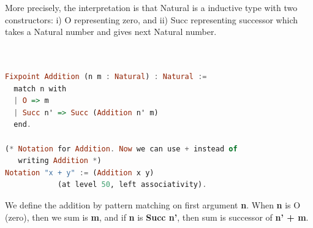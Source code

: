 More precisely, the interpretation is that Natural is a inductive type with two constructors: i) O representing zero,
and ii) Succ representing successor which takes a Natural number and gives next Natural number.

\begin{lstlisting}[language=haskell, numbers=none, basicstyle=\ttfamily,  caption=Addition function for Natural Numbers,  captionpos=b, xleftmargin=.1\textwidth]

 
Fixpoint Addition (n m : Natural) : Natural :=
  match n with
  | O => m
  | Succ n' => Succ (Addition n' m)
  end.

(* Notation for Addition. Now we can use + instead of 
   writing Addition *)
Notation "x + y" := (Addition x y)
            (at level 50, left associativity).
\end{lstlisting}

We define the addition by pattern matching on first argument \textbf{n}. When \textbf{n} is 
O (zero), then we sum is \textbf{m}, and if \textbf{n} is \textbf{Succ n'}, then sum is successor of 
\textbf{n' +  m}.


